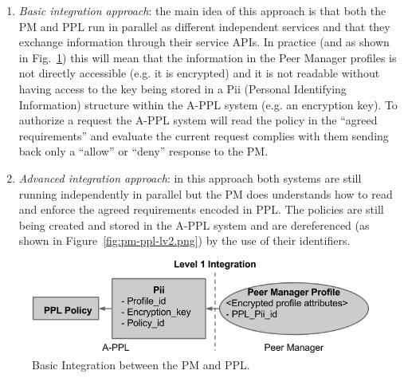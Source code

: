 \begin{enumerate}
	\item \emph{Basic integration approach}: the main idea of this approach is that both the PM and PPL run in parallel as different independent services and that they exchange information through their service APIs. In practice (and as shown in Fig.~\ref{fig:pm-ppl-lv1.png}) this will mean that the information in the Peer Manager profiles is not directly accessible (e.g. it is encrypted) and it is not readable without having access to the key being stored in a Pii (Personal Identifying Information) structure within the A-PPL system  (e.g. an encryption key). To authorize a request the A-PPL system will read the policy in the ``agreed requirements'' and evaluate the current request complies with them sending back only a ``allow'' or ``deny'' response to the PM. 
	\item \emph{Advanced integration approach}: in this approach both systems are still running independently in parallel  but the PM does understands how to read and enforce the agreed requirements encoded in PPL. The policies are still being created and stored in the A-PPL system and are dereferenced (as shown in Figure~\ref{fig:pm-ppl-lv2.png}) by the use of their identifiers.
\end{enumerate}

\begin{figure}[htb!]
\centering
\includegraphics[width=0.8\linewidth]{figures/pm-ppl-lv1.png}
\caption{Basic Integration between the PM and PPL.}
\label{fig:pm-ppl-lv1.png}
\end{figure}

